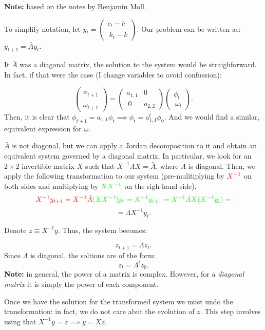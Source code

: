 \documentclass[11pt,a4paper,english]{article}
\begin{document}
\textbf{Note:} based on the notes by
\href{http://www.princeton.edu/~moll/ECO503Web/Lecture4_ECO503.pdf}{Benjamin
Moll}.

To simplify notation, let
\(y_{t} = \begin{pmatrix} c_{t} - \bar{c} \\\ k_{t} -\bar{k} \end{pmatrix}.\)
Our problem can be written as: \(y_{t+1} = \bar{A} y_{t}\).

It \(\bar{A}\) was a diagonal matrix, the solution to the system would
be straighforward. In fact, if that were the case (I change variables to
avoid confussion):

\[\begin{pmatrix} \phi_{t+1} \\\\ \omega_{t+1} \end{pmatrix} = \begin{pmatrix} a_{1,1} & 0 \\\ 0 & a_{2,2} \end{pmatrix} \begin{pmatrix} \phi_{t} \\\ \omega_{t} \end{pmatrix}.\]
Then, it is clear that
\(\phi_{t+1} = a_{1,1} \phi_{t} \implies \phi_{t} = a_{1,1}^{t} \phi_{0}.\)
And we would find a similar, equivalent expression for \(\omega.\)

\(\bar{A}\) is not diagonal, but we can apply a Jordan decomposition to
it and obtain an equivalent system governed by a diagonal matrix. In
particular, we look for an \(2 \times 2\) invertible matrix \(X\) such
that \( X^{-1} \Lambda X = \bar{A}\), where \(\Lambda\) is
diagonal. Then, we apply the following transformation to our system
(pre-mulitiplying by \(\color{red}{X^{-1}}\) on both sides and
multiplying by \(\color{green}{XX^{-1}}\) on the righ-hand side).
\[ \color{red}{X^{-1}} y_{t+1} = \color{red}{X^{-1}} \bar{A} \color{green}{(X X^{-1})} y_{t} = X^{-1} y_{t+1} = X^{-1} \bar{A} X (X^{-1} y_{t}) =\]
\[ = \Lambda X^{-1} y_{t}.\]

Denote \(z \equiv X^{-1} y\). Thus, the system becomes:

\[z_{t+1} = \Lambda z_{t}.\] Since \(\Lambda\) is diagonal, the soltions
are of the form: \[z_{t} = \Lambda^{t} z_{0}.\] \textbf{Note:} in
general, the power of a matrix is complex. However, for a \emph{diagonal
matrix} it is simply the power of each component.

Once we have the solution for the transformed system we must undo the
transformation: in fact, we do not care abut the evolution of \(z\).
This step involves using that \(X^{-1} y = z \implies y = X z\).
\end{document}
